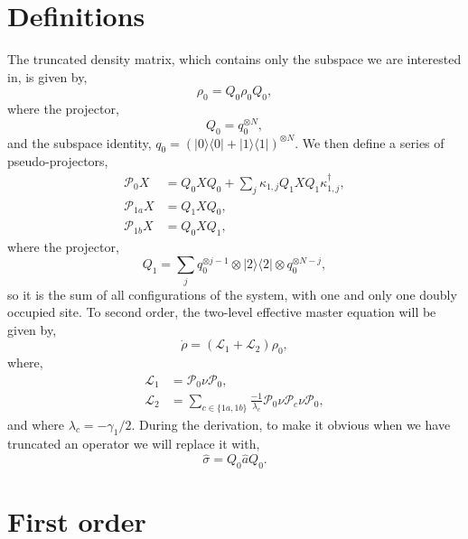 \section{Definitions}
The truncated density matrix, which contains only the subspace we are interested in, is given by, 
\begin{equation}
	\rho_{0} = Q_{0}\rho_{0}Q_{0},
	\label{eq:adelim6}
\end{equation}
where the projector,
\begin{equation}
	Q_{0} = q_{0}^{\otimes N},
	\label{eq:adelim7}
\end{equation}
and the subspace identity, \(q_{0} = (|0 \rangle \langle 0| + |1 \rangle \langle 1|)^{\otimes N}\). We then define a series of pseudo-projectors, 
\begin{align}
	\mathcal{P}_{0}X &= Q_{0}XQ_{0} + \sum_{j} \kappa_{1,j}Q_{1}XQ_{1}\kappa_{1,j}^{\dagger}, \label{eq:adelim8} \\
	\mathcal{P}_{1a}X &= Q_{1}XQ_{0}, \label{eq:adelim9} \\
	\mathcal{P}_{1b}X &= Q_{0}XQ_{1}, \label{eq:adelim10}
\end{align}
where the projector,
\begin{equation}
	Q_{1} = \sum_{j} q_{0}^{\otimes j-1} \otimes |2 \rangle \langle 2| \otimes q_{0}^{\otimes N-j},
	\label{eq:adelim11}
\end{equation}
so it is the sum of all configurations of the system, with one and only one doubly occupied site. To second order, the two-level effective master equation will be given by,
\begin{equation}
	\dot{\rho} = \left(\mathcal{L}_{1} + \mathcal{L}_{2}\right)\rho_{0},
	\label{eq:adelim12}
\end{equation}
where,
\begin{align}
	\mathcal{L}_{1} &= \mathcal{P}_{0}\nu\mathcal{P}_{0}, \label{eq:adelim13} \\
	\mathcal{L}_{2} &= \sum_{c \in \{1a, 1b\}} \frac{-1}{\lambda_{c}} \mathcal{P}_{0}\nu\mathcal{P}_{c}\nu\mathcal{P}_{0}, \label{eq:adelim14}
\end{align}
and where \(\lambda_{c} = -\gamma_{1}/2\). During the derivation, to make it obvious when we have truncated an operator we will replace it with,
\begin{equation}
	\hat{\sigma} = Q_{0}\hat{a}Q_{0}.
	\label{eq:adelim15}
\end{equation}

\section{First order}

